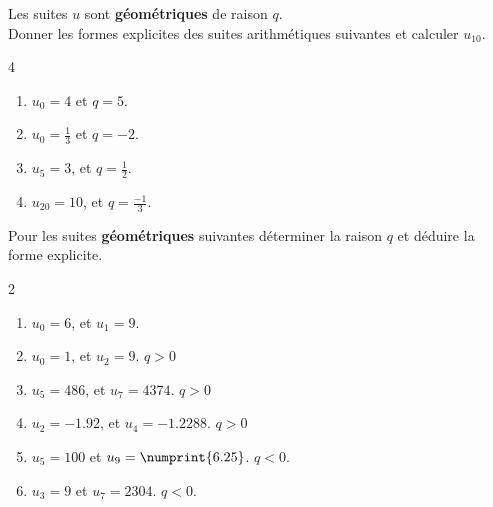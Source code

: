 \documentclass[main.tex]{subfiles}
\begin{document}
\vspace{-0.5em}
\begin{exercise} \label{chapter05:exercise:suites14}    Les suites $u$ sont \textbf{géométriques} de raison $q$. \\
	Donner les formes explicites des suites arithmétiques suivantes et calculer $u_{10}$.
	\vspace{-0.5em}
	\begin{multicols}{4}
		\begin{enumerate}[label=\arabic*),leftmargin=*]
			\item $u_0=4$ et $q=5$.  
			\item $u_0=\frac{1}{3}$ et $q=-2$. 
			\item $u_5=\num{3}$, et $q=\frac{1}{2}$. 
			\item $u_{20}=\num{10}$, et $q=\frac{-1}{3}$. 
		\end{enumerate}
	\end{multicols}
\end{exercise}
\vspace{-0.5em}
\begin{exercise} \label{chapter05:exercise:suites15}  
Pour les suites \textbf{géométriques} suivantes déterminer la raison $q$ et déduire la forme explicite.
\vspace{-0.5em}
	\begin{multicols}{2}
		\begin{enumerate}[label=\arabic*),leftmargin=*]
			\item $u_0=\num{6}$, et $u_1=9$. 
			\item $u_0=\num{1}$, et $u_2=9$. $q>0$
			\item $u_5=\num{486}$, et $u_7=4374$. $q>0$
			\item $u_2=\num{-1.92}$, et $u_4=\num{-1.2288}$. $q>0$
			\item $u_5=100$ et $u_9=\numprint{6.25}$. $q<0$.
			\item $u_3=9$ et $u_7=2304$. $q<0$.
		\end{enumerate}
	\end{multicols}
\end{exercise}
\vspace{-0.5em}
 
\end{document}
